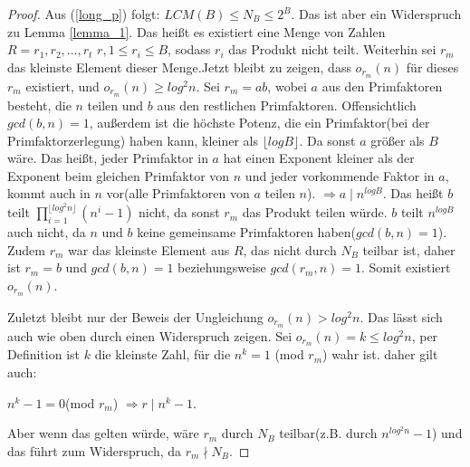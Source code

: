 \documentclass[12pt,oneside]{article}
\theoremstyle{remark}
\theoremstyle{definition}
\begin{document}
\begin{flushleft}
\begin{proof}
Aus (\ref{long_p}) folgt: $LCM(B) \leq N_{B} \leq 2^B$. Das ist aber ein Widerspruch zu Lemma \ref{lemma_1}. Das heißt es existiert eine Menge von Zahlen $R = {r_{1},r_{2},...,r_{t}}$ $r, 1 \leq r_i \leq B$, sodass $r_{i}$ das Produkt nicht teilt. Weiterhin sei $r_{m}$ das kleinste Element dieser Menge.\newline\newline Jetzt bleibt zu zeigen, dass $o_{r_{m}}(n)$ für dieses $r_{m}$ existiert, und $o_{r_{m}}(n) \geq log^2 n$. Sei $r_{m} = ab $, wobei $a$ aus den Primfaktoren besteht, die $n$ teilen und $b$ aus den restlichen Primfaktoren. Offensichtlich $gcd(b,n) = 1$, außerdem ist die höchste Potenz, die ein Primfaktor(bei der Primfaktorzerlegung) haben kann, kleiner als $\lfloor log B \rfloor$. Da sonst $a$ größer als $B$ wäre. Das heißt, jeder Primfaktor in $a$ hat einen Exponent kleiner als der Exponent beim gleichen Primfaktor von $n$ und jeder vorkommende Faktor in $a$, kommt auch in $n$ vor(alle Primfaktoren von $a$ teilen $n$).\newline
$\Rightarrow a \mid n^{log B}$.\newline
Das heißt $b$ teilt $\prod_{i = 1}^{\lfloor log^2 n \rfloor}(n^i - 1)$ nicht, da sonst $r_{m}$ das Produkt teilen würde. $b$ teilt $n^{log B}$ auch nicht, da $n$ und $b$ keine gemeinsame Primfaktoren haben($gcd(b,n) = 1$). Zudem $r_{m}$ war das kleinste Element aus $R$, das nicht durch $N_{B}$ teilbar ist, daher ist $r_{m}= b$ und $gcd(b,n) = 1$ beziehungsweise $gcd(r_{m},n) = 1$. Somit existiert $o_{r_{m}}(n)$.\newline\newline

Zuletzt bleibt nur der Beweis der Ungleichung $o_{r_{m}}(n) > log^2 n$. Das lässt sich auch wie oben durch einen Widerspruch zeigen. Sei $o_{r_{m}}(n) = k \leq log^2 n$, per Definition ist $k$ die kleinste Zahl, für die $n^k = 1$ (mod $r_{m}$) wahr ist. daher gilt auch:\newline\newline
\centerline{$n^k - 1 = 0 $(mod  $r_{m}$) $\Rightarrow r \mid n^k - 1$.}

Aber wenn das gelten würde, wäre $r_{m}$ durch $N_{B}$ teilbar(z.B. durch $n^{log^2 n} -1$) und das führt zum Widerspruch, da $r_{m} \nmid N_{B}$. 
\end{proof}

\end{flushleft}
\end{document}
